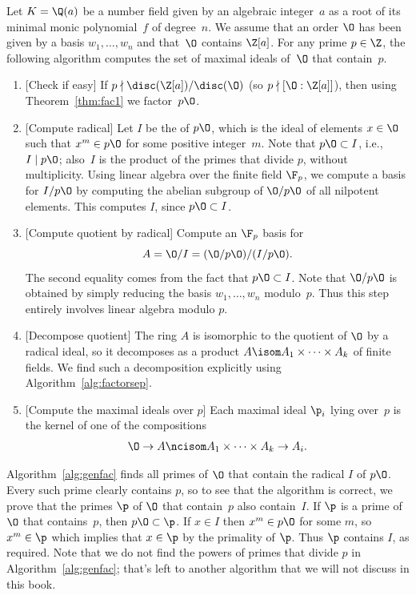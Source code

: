 \begin{algorithm}\label{alg:genfac}
Let $K=\Q(a)$ be a number field given
by an algebraic integer~$a$ as a root of its
minimal monic polynomial~$f$ of degree~$n$.
We assume that an order $\O$ has been
given by a basis $w_1,\ldots,w_n$
and that~$\O$ contains $\Z[a]$.
For any prime $p\in\Z$, the following
algorithm computes the set of maximal ideals of~$\O$ that contain~$p$.
\begin{enumerate}
\item{} [Check if easy] If $p\nmid \disc(\Z[a]) / \disc(\O)$ (so
$p\nmid [\O:\Z[a]]$), then using Theorem~\ref{thm:fac1} we
factor~$p\O$.
\item{} [Compute radical]
Let $I$ be the  of $p\O$, which is the ideal of
elements $x\in\O$ such that $x^m\in p\O$
for some positive integer~$m$.  Note that $p\O \subset I$, i.e.,
$I\mid p\O$; also~$I$ is the product
of the primes that divide $p$, without multiplicity.
Using linear algebra over the finite field
$\F_p$, we compute a basis for $I/p\O$ by computing
the abelian subgroup of $\O/p\O$ of all nilpotent
elements.  This computes $I$, since $p\O\subset I$.
\item{} [Compute quotient by radical]
Compute an $\F_p$ basis for
$$
  A = \O/I = (\O/p\O)/(I/p\O).
$$
The second equality comes from the fact that $p\O\subset I$.
Note that $\O/p\O$
is obtained by simply reducing the basis $w_1,\ldots, w_n$ modulo~$p$.
Thus this step entirely involves linear algebra modulo $p$.

\item{} [Decompose quotient] The ring $A$ is isomorphic to
the quotient of $\O$ by a radical ideal,
so it decomposes as a product
$A \isom A_1 \times \cdots \times A_k$ of finite fields.
We find such a decomposition explicitly using Algorithm~\ref{alg:factorsep}.

\item{} [Compute the maximal ideals over $p$] Each maximal ideal
  $\p_i$ lying over~$p$ is the kernel of one of the compositions
$$\O \to A \ncisom A_1 \times \cdots \times A_k \to A_i.$$
\end{enumerate}
\end{algorithm}
Algorithm~\ref{alg:genfac} finds all primes of $\O$ that contain the radical $I$ of
$p\O$.  Every such prime clearly contains $p$, so to see that the
algorithm is correct, we prove that the primes $\p$ of $\O$ that
contain~$p$ also contain~$I$.  If $\p$ is a prime of $\O$ that
contains~$p$, then $p\O \subset \p$.  If $x\in I$ then $x^m\in p\O$
for some $m$, so $x^m\in \p$ which implies that $x\in \p$ by the primality
of $\p$.  Thus $\p$ contains $I$, as required.  Note that we do not find the powers of
primes that divide $p$ in Algorithm~\ref{alg:genfac}; that's left to another
algorithm that we will not discuss in this book.


